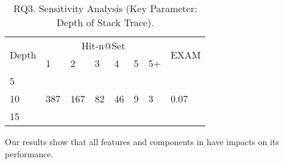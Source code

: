 
\begin{table}[t]
	\caption{RQ3. Sensitivity Analysis (Key Parameter: Depth of Stack Trace).}
	{\small
		\begin{center}
			\renewcommand{\arraystretch}{1}
			\begin{tabular}{p{1cm}|p{0.3cm}<{\centering}|p{0.3cm}<{\centering}|p{0.3cm}<{\centering}|p{0.3cm}<{\centering}|p{0.3cm}<{\centering}|p{0.3cm}<{\centering}|p{0.7cm}<{\centering}}
				\hline
				\multirow{2}{*}{Depth}    & \multicolumn{6}{c|}{Hit-n@Set}& \multirow{2}{*}{EXAM}\\
				\cline{2-7}
				&1&2&3&4&5&5+&\\
				
				\hline 
				5 			                &  &  &   &  &  &    & \\
				10                          & 387 & 167 & 82  & 46 & 9 & 3   & 0.07\\
				15	                        &  &  &   &  &  &    & \\
				\hline
			\end{tabular}
			
			\label{fig:rq3-2}
		\end{center}
	}
\end{table}


Our results show that all features and components in {\tool} have
impacts on its performance.
